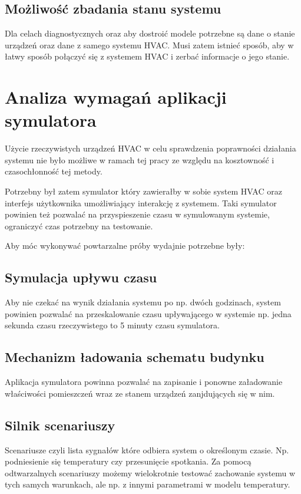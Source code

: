 \subsection*{Możliwość zbadania stanu systemu}
Dla celach diagnostycznych oraz aby dostroić modele potrzebne są dane o stanie urządzeń oraz dane z samego systemu HVAC. Musi zatem istnieć sposób, aby w łatwy sposób połączyć się z systemem HVAC i zerbać informacje o jego stanie.

\section{Analiza wymagań aplikacji symulatora}
Użycie rzeczywistych urządzeń HVAC w celu sprawdzenia poprawności działania systemu nie było możliwe w ramach tej pracy ze względu na kosztowność i czasochłonność tej metody. 

Potrzebny był zatem symulator który zawierałby w sobie system HVAC oraz interfejs użytkownika umożliwiający interakcję z systemem. Taki symulator powinien też pozwalać na przyspieszenie czasu w symulowanym systemie, ograniczyć czas potrzebny na testowanie.

Aby móc wykonywać powtarzalne próby wydajnie potrzebne były:

\subsection*{Symulacja upływu czasu}
Aby nie czekać na wynik działania systemu po np. dwóch godzinach, system powinien pozwalać na przeskalowanie czasu upływającego w systemie np. jedna sekunda czasu rzeczywistego to 5 minuty czasu symulatora.

\subsection*{Mechanizm ładowania schematu budynku}
Aplikacja symulatora powinna pozwalać na zapisanie i ponowne załadowanie właściwości pomieszczeń wraz ze stanem urządzeń zanjdujących się w nim.

\subsection*{Silnik scenariuszy}
Scenariusze czyli lista sygnałów które odbiera system o określonym czasie. Np. podniesienie się temperatury czy przesunięcie spotkania. Za pomocą odtwarzalnych scenariuszy możemy wielokrotnie testować zachowanie systemu w tych samych warunkach, ale np. z innymi parametrami w modelu temperatury.

